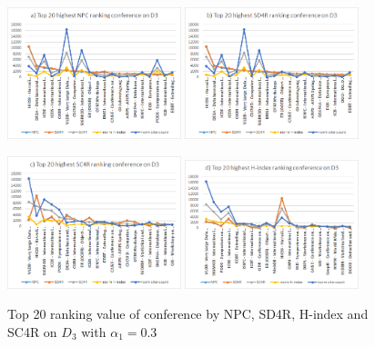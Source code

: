 \documentclass[10pt,leqno,twoside]{article}
\begin{document}
\begin{figure} %
	\caption{Top 20 ranking value of conference by NPC, SD4R, H-index and SC4R on $D_3$ with $\alpha_1=0.3$}
	\label{Fig:Top20ConferenceD3}
    \centering
    \includegraphics[width=0.45\textwidth]{D3t20cNPC}
    \includegraphics[width=0.45\textwidth]{D3t20cSD4R}

    \includegraphics[width=0.45\textwidth]{D3t20cSC4R}
    \includegraphics[width=0.45\textwidth]{D3t20cHindex}
\end{figure}
\end{document}

